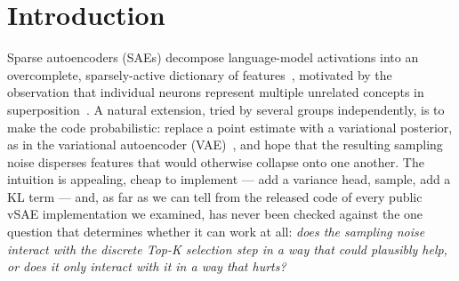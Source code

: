 \documentclass[11pt]{article}
\begin{document}
\begin{abstract}
incompatible with \emph{hard, discrete} selection, and the failure mode of a
\emph{soft} selection mechanism under the same noise is a different one ---
sparsity collapse, not selection churn. \textbf{Third}, each of six one-line
implementation details --- the five above and a ReLU on the posterior mean ---
measured as a one-factor contrast, moves at least one pre-registered metric by
$|d|\ge7.3$ (up to $175$), none of them stated in any equation, and a
design-level survey of ten SAE-methods
papers (every one cited in our own related work) finds \emph{ten of ten}
report a single training seed per configuration for their headline
results --- a design that cannot express statistical significance for an
architecture-level claim at any effect size. We close with a case study (SAEBench's SCR and
TPP metrics scored against the same two checkpoints, the same dataset, the
same masking grid) where two standard downstream metrics disagree in
direction on whether the vSAE's apparent advantage survives a dictionary-size
control, and report five controls run against that disagreement without
resolving it --- offered as a demonstration of the general problem, not a
verdict on either metric.
\end{abstract}

\section{Introduction}
\label{sec:intro}

Sparse autoencoders (SAEs) decompose language-model activations into an
overcomplete, sparsely-active dictionary of
features~\citep{sharkey2022taking,cunningham2023sparse,bricken2023monosemanticity},
motivated by the observation that individual neurons represent multiple
unrelated concepts in
superposition~\citep{elhage2022superposition}. A natural extension, tried by
several groups independently, is to make the code probabilistic: replace a
point estimate with a variational posterior, as in the variational autoencoder
(VAE)~\citep{kingma2013autoencoding}, and hope that the resulting sampling
noise disperses features that would otherwise collapse onto one another. The
intuition is appealing, cheap to implement --- add a variance head, sample,
add a KL term --- and, as far as we can tell from the released code of every
public vSAE implementation we examined, has never been checked against the
one question that determines whether it can work at all: \emph{does the
sampling noise interact with the discrete Top-K selection step in a way that
could plausibly help, or does it only interact with it in a way that hurts?}
\end{document}
